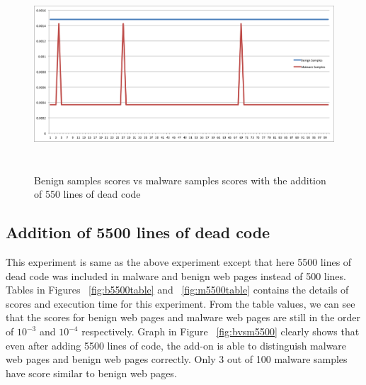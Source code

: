 \begin{figure}[h]
    \centering    
    \includegraphics[width=16cm, height=7.2cm]{500.png}
    \caption[Benign Samples vs Malware Samples]{Benign samples scores vs malware samples scores with the addition of 550 lines of dead code}
    \label{fig:bvsm500}
\end{figure}


\subsection{Addition of 5500 lines of dead code}
This experiment is same as the above experiment except that here 5500 lines of dead code was included in malware and benign web pages instead of 500 lines. Tables in Figures ~\ref{fig:b5500table} and  ~\ref{fig:m5500table} contains the details of scores and execution time for this experiment. From the table values, we can see that the scores for benign web pages and malware web pages are still in the order of $10^{-3}$ and $10^{-4}$ respectively. Graph in Figure ~\ref{fig:bvsm5500} clearly shows that even after adding 5500 lines of code, the add-on is able to distinguish malware web pages and benign web pages correctly. Only 3 out of 100 malware samples have score similar to benign web pages.


